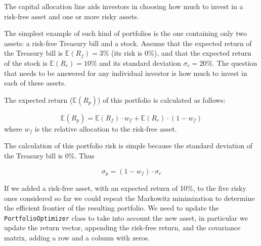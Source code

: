 The capital allocation line aids investors in choosing how much to invest in a risk-free asset and one or more risky assets.

The simplest example of such kind of portfolios is the one containing only two assets: a risk-free Treasury bill and a stock. Assume that the expected return of the Treasury bill is $\mathbb{E}(R_f)=3\%$ (its risk is 0\%), and that the expected return of the stock is $\mathbb{E}(R_r)=10\%$ and its standard deviation $\sigma_r=20\%$. The question that needs to be answered for any individual investor is how much to invest in each of these assets.

The expected return ($\mathbb{E}(R_p)$) of this portfolio is calculated as follows:

\begin{equation*}
\mathbb{E}(R_p) = \mathbb{E}(R_f)\cdot w_f + \mathbb{E}(R_r)\cdot (1- w_f)
\end{equation*}
where $w_f$ is the relative allocation to the risk-free asset.

The calculation of this portfolio risk is simple because the standard deviation of the Treasury bill is 0\%. Thus

\begin{equation*}
\sigma_p = (1-w_f)\cdot \sigma_r
\end{equation*}
%

If we added a risk-free asset, with an expected return of 10\%, to the five risky ones considered so far we could repeat the Markowitz minimization to determine the efficient frontier of the resulting portfolio. We need to update the \texttt{PortfolioOptimizer} class to take into account the new asset, in particular we update the return vector, appending the risk-free return, and the covariance matrix, adding a row and a column with zeros.

